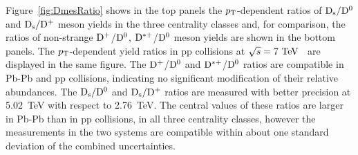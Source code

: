 Figure~\ref{fig:DmesRatio} shows in the top panels the $p_{\rm T}$-dependent ratios of
${\rm D_s}/{\rm D^0}$ and ${\rm D_s}/{\rm D^+}$ meson yields in the three centrality classes and, for 
comparison, the ratios of non-strange ${\rm D^+}$/${\rm D^0}$, ${\rm D^{*+}}$/${\rm D^0}$ meson yields
are shown in the bottom panels.
The $p_{\rm T}$-dependent yield ratios in pp collisions at $\sqrt s=7~\mathrm{TeV}$~\cite{Acharya:2017jgo}
are displayed in the same figure. 
The ${\rm D^+}$/${\rm D^0}$ and ${\rm D^{*+}}$/${\rm D^0}$ ratios are compatible in Pb-Pb and pp collisions, 
indicating no significant modification of their relative abundances. 
The ${\rm D_s}/{\rm D^0}$ and ${\rm D_s}/{\rm D^+}$ ratios are measured with better 
precision at 5.02~TeV with respect to 2.76~TeV.
The central values of these ratios are larger in Pb-Pb than in pp collisions, 
in all three centrality classes, however the measurements in the two systems 
are compatible within about one standard deviation of the combined uncertainties.\\

